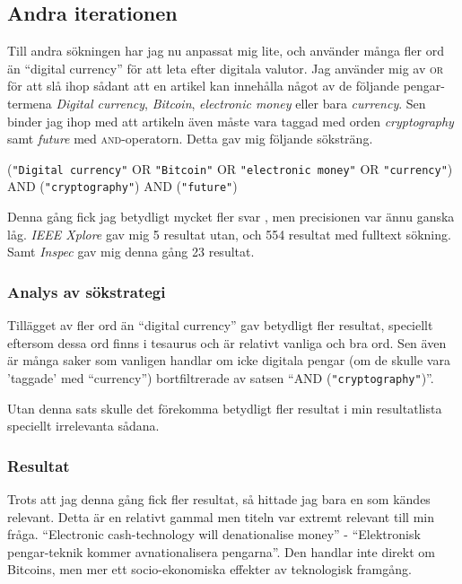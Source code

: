 \documentclass[a4paper,11pt,exjobb]{kth-mag}
\begin{document}
\subsection{Andra iterationen}
\label{sec:second}
Till andra sökningen har jag nu anpassat mig lite, och använder många fler ord än ``digital currency'' för att leta efter digitala valutor. Jag använder mig av \textsc{or} för att slå ihop sådant att en artikel kan innehålla något av de följande pengar-termena \textit{Digital currency}, \textit{Bitcoin}, \textit{electronic money} eller bara \textit{currency}. Sen binder jag ihop med att artikeln även måste vara taggad med orden \textit{cryptography} samt \textit{future} med \textsc{and}-operatorn.
 Detta gav mig följande söksträng.
\begin{center}
(\verb#"Digital currency"# \textsc{OR} \verb#"Bitcoin"# \textsc{OR} \verb#"electronic money"# \textsc{OR} \verb#"currency"#) \textsc{AND} (\verb#"cryptography"#) \textsc{AND} (\verb#"future"#)
\end{center}

Denna gång fick jag betydligt mycket fler svar , men precisionen var ännu ganska låg. \textit{IEEE Xplore} gav mig 5 resultat utan, och 554 resultat med fulltext sökning. Samt \textit{Inspec} gav mig denna gång 23 resultat.

\subsubsection{Analys av sökstrategi}
Tillägget av fler ord än ``digital currency'' gav betydligt fler resultat, speciellt eftersom dessa ord finns i tesaurus och är relativt vanliga och bra ord. Sen även är många saker som vanligen handlar om icke digitala pengar (om de skulle vara 'taggade' med ``currency'') bortfiltrerade av satsen ``\textsc{AND} (\verb#"cryptography"#)''.

Utan denna sats skulle det förekomma betydligt fler resultat i min resultatlista speciellt irrelevanta sådana.

\subsubsection{Resultat}
Trots att jag denna gång fick fler resultat, så hittade jag bara en\cite{second} som kändes relevant. Detta är en relativt gammal men titeln var extremt relevant till min fråga. ``Electronic cash-technology will denationalise money'' - ``Elektronisk pengar-teknik kommer avnationalisera pengarna''. Den handlar inte direkt om Bitcoins, men mer ett socio-ekonomiska effekter av teknologisk framgång.
\end{document}
